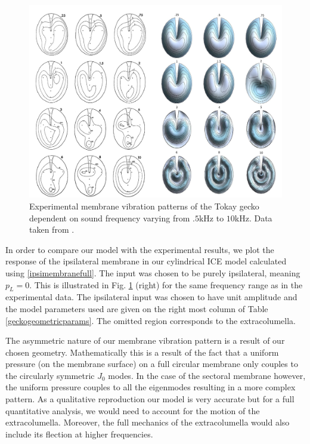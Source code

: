 \begin{figure}[ht!]
 \centering
 \includegraphics[width=1.0\linewidth]{Diagrams/manleymodelcomparison.png}
 \caption[Tokay gecko tympanum vibration profiles.]{Experimental membrane vibration patterns of the Tokay gecko dependent
 on sound frequency varying from $.5$kHz to $10$kHz. Data taken from \cite{manleygecko1}.}
  \label{manleygeckotympanum}
\end{figure}

In order to compare our model with the experimental results, we plot the response of the ipsilateral membrane in our cylindrical ICE model 
calculated using \eqref{ipsimembranefull}. The input was chosen to be purely ipsilateral, meaning $p_L=0$. 
This is illustrated in Fig. \ref{manleygeckotympanum} (right) for the same frequency range as in the experimental data. The ipsilateral input was chosen to have unit amplitude and the model parameters used are given
on the right most column of Table \ref{geckogeometricparams}. The omitted region corresponds to the extracolumella. 

The asymmetric nature of our membrane vibration pattern is a result of our chosen geometry.
Mathematically this is a result of the fact that a uniform pressure (on the membrane surface) on a full circular membrane only couples to the circularly symmetric $J_0$ modes.
In the case of the sectoral membrane however, the uniform pressure couples to all the eigenmodes resulting in a more complex pattern.
As a qualitative reproduction our model is very accurate but for a full quantitative analysis, we would 
need to account for the motion of the extracolumella. Moreover, the full mechanics of the extracolumella would 
also include its flection at higher frequencies.

